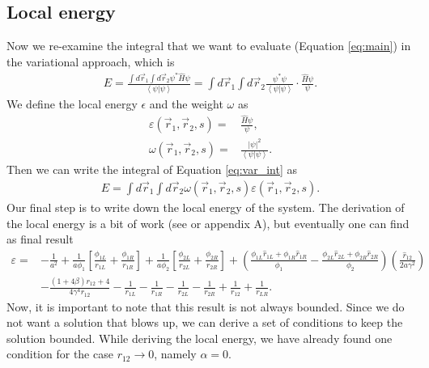 \subsection{Local energy}
Now we re-examine the integral that we want to evaluate (Equation \ref{eq:main}) in the variational approach, which is
\begin{align}
E = \frac{{\int {d{{\vec r}_1}\int {d{{\vec r}_2}} {\psi ^ * }\hat H\psi } }}{{\left\langle \psi  \right|\left. \psi  \right\rangle }} = \int {d{{\vec r}_1}\int {d{{\vec r}_2}} \frac{{{\psi ^ * }\psi }}{{\left\langle \psi  \right|\left. \psi  \right\rangle }} \cdot \frac{{\hat H\psi }}{\psi }}
\label{eq:var_int}.
\end{align}
We define the local energy $\epsilon$ and the weight $\omega$ as
\begin{align}
\varepsilon \left( {{{\vec r}_1},{{\vec r}_2},s} \right) =& \frac{{\hat H\psi }}{\psi },\\
\omega \left( {{{\vec r}_1},{{\vec r}_2},s} \right) =& \frac{{{{\left| \psi  \right|}^2}}}{{\left\langle \psi  \right|\left. \psi  \right\rangle }}.
\end{align}
Then we can write the integral of Equation \ref{eq:var_int} as 
\begin{align}
E = \int {d{{\vec r}_1}\int {d{{\vec r}_2}} \omega \left( {{{\vec r}_1},{{\vec r}_2},s} \right)\varepsilon \left( {{{\vec r}_1},{{\vec r}_2},s} \right)}.
\end{align}
Our final step is to write down the local energy of the system. The derivation of the local energy is a bit of work (see \cite{MSU_paper} or appendix A), but eventually one can find as final result
\begin{align}
\varepsilon  =&  - \frac{1}{{{a^2}}} + \frac{1}{{a{\phi _1}}}\left[ {\frac{{{\phi _{1L}}}}{{{r_{1L}}}} + \frac{{{\phi _{1R}}}}{{{r_{1R}}}}} \right] + \frac{1}{{a{\phi _2}}}\left[ {\frac{{{\phi _{2L}}}}{{{r_{2L}}}} + \frac{{{\phi _{2R}}}}{{{r_{2R}}}}} \right] + \left( {\frac{{{\phi _{1L}}{{\hat r}_{1L}} + {\phi _{1R}}{{\hat r}_{1R}}}}{{{\phi _1}}} - \frac{{{\phi _{2L}}{{\hat r}_{2L}} + {\phi _{2R}}{{\hat r}_{2R}}}}{{{\phi _2}}}} \right)\left( {\frac{{{{\hat r}_{12}}}}{{2a{\gamma ^2}}}} \right)\nonumber\\
 &- \frac{{\left( {1 + 4\beta } \right){r_{12}} + 4}}{{4{\gamma ^4}{r_{12}}}} - \frac{1}{{{r_{1L}}}} - \frac{1}{{{r_{1R}}}} - \frac{1}{{{r_{2L}}}} - \frac{1}{{{r_{2R}}}} + \frac{1}{{{r_{12}}}} + \frac{1}{{{r_{LR}}}}.
\end{align}
Now, it is important to note that this result is not always bounded. Since we do not want a solution that blows up, we can derive a set of conditions to keep the solution bounded. While deriving the local energy, we have already found one condition for the case $r_{12}\rightarrow0$, namely $\alpha=0$.
